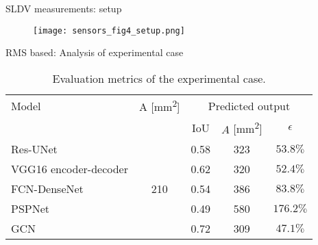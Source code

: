 \documentclass[10pt,aspectratio=169,dvipsnames]{beamer} %
\begin{document}
	\begin{frame}{SLDV measurements: setup}
		\begin{figure}
			\texttt{[image: sensors\_fig4\_setup.png]}
		\end{figure}
	\end{frame}
	\setcounter{subfigure}{0}
	\begin{frame}{RMS based: Analysis of experimental case}
		\begin{table}[!ht]
			\centering
			\caption{Evaluation metrics of the experimental case.}
			\label{tab:rms_exp_case_}
			\begin{tabular}{l@{\ }cccc}
				\toprule
				\multicolumn{1}{l}{Model} & \multicolumn{1}{c}{A [mm\textsuperscript{2}]} & \multicolumn{3}{c}{Predicted output} \\ 
				\cmidrule(lr){3-5} & & \multicolumn{1}{c}{IoU} & \multicolumn{1}{c}{\(\hat{A}\) [mm\textsuperscript{2}]} & \(\epsilon\) \\ \midrule
				Res-UNet & \multicolumn{1}{c}{\multirow{5}{*}{210}} & \multicolumn{1}{c}{0.58} & \multicolumn{1}{c}{323}  & \(53.8\%\) \\ 
				VGG16 encoder-decoder &  & \multicolumn{1}{c}{0.62} & \multicolumn{1}{c}{320} & \(52.4\%\) 
				\\ 
				FCN-DenseNet &  & \multicolumn{1}{c}{0.54} & \multicolumn{1}{c}{386} & \(83.8\%\) \\ 
				PSPNet &  & \multicolumn{1}{c}{0.49} & \multicolumn{1}{c}{580} & \(176.2\%\) 
				\\ 
				GCN &  & \multicolumn{1}{c}{0.72} & \multicolumn{1}{c}{309} & \(47.1\%\) 
				\\ 
				\bottomrule
			\end{tabular}		
		\end{table}
	\end{frame}
\end{document}
